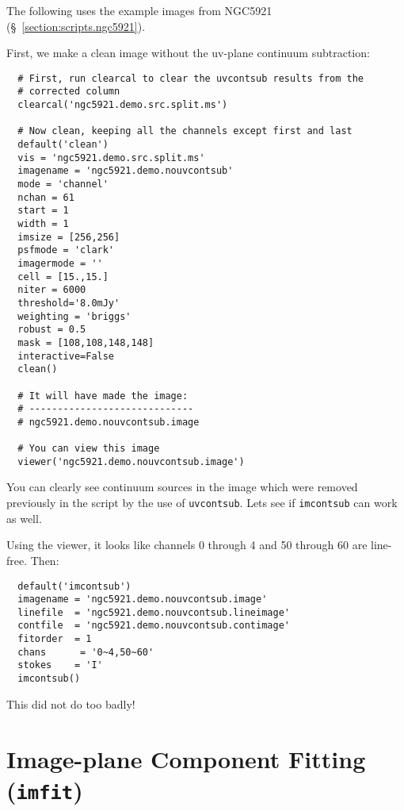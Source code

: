 The following uses the example images from NGC5921
(\S~\ref{section:scripts.ngc5921}).

First, we make a clean image without the uv-plane continuum
subtraction:
\small
\begin{verbatim}
  # First, run clearcal to clear the uvcontsub results from the
  # corrected column
  clearcal('ngc5921.demo.src.split.ms')
  
  # Now clean, keeping all the channels except first and last
  default('clean')
  vis = 'ngc5921.demo.src.split.ms'
  imagename = 'ngc5921.demo.nouvcontsub'
  mode = 'channel'
  nchan = 61
  start = 1
  width = 1
  imsize = [256,256]
  psfmode = 'clark'
  imagermode = ''
  cell = [15.,15.]
  niter = 6000
  threshold='8.0mJy'
  weighting = 'briggs'
  robust = 0.5
  mask = [108,108,148,148]
  interactive=False
  clean()
  
  # It will have made the image:
  # -----------------------------
  # ngc5921.demo.nouvcontsub.image

  # You can view this image
  viewer('ngc5921.demo.nouvcontsub.image')
\end{verbatim}
\normalsize
You can clearly see continuum sources in the image which were removed
previously in the script by the use of {\tt uvcontsub}.  Lets see
if {\tt imcontsub} can work as well.

Using the viewer, it looks like channels 0 through 4 and
50 through 60 are line-free.  Then:
\small
\begin{verbatim}
  default('imcontsub')
  imagename = 'ngc5921.demo.nouvcontsub.image'
  linefile  = 'ngc5921.demo.nouvcontsub.lineimage'
  contfile  = 'ngc5921.demo.nouvcontsub.contimage'
  fitorder  = 1
  chans      = '0~4,50~60'
  stokes    = 'I'
  imcontsub()
\end{verbatim}
\normalsize
This did not do too badly!

\section{Image-plane Component Fitting ({\tt imfit})}
\label{section:analysis.imfit}

